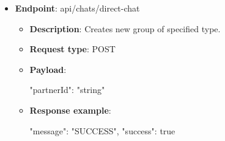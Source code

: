 \begin{itemize}
\begin{itemize}
        \item \textbf{Request type}: POST

        \item \textbf{Payload}:

        \begin{spverbatim}
        {
            "groupType": integer,
            "groupTitle": "string"
        }
        \end{spverbatim}

        \item \textbf{Response example}:

        \begin{spverbatim}
        {
            "message": "SUCCESS",
            "success": true
        }
        \end{spverbatim}

        \item \textbf{Response codes}: 200, 400, 401

        \item \textbf{Response messages}:
        \begin{enumerate}
            \item Success.
            \item User not found.
        \end{enumerate}
    \end{itemize}

    \item \textbf{Endpoint}: api/chats/direct-chat

    \begin{itemize}
        \item \textbf{Description}: Creates new group of specified type.

        \item \textbf{Request type}: POST

        \item \textbf{Payload}:

        \begin{spverbatim}
        {
            "partnerId": "string"
        }
        \end{spverbatim}

        \item \textbf{Response example}:

        \begin{spverbatim}
        {
            "message": "SUCCESS",
            "success": true
        }
        \end{spverbatim}


\end{itemize}
\end{itemize}
